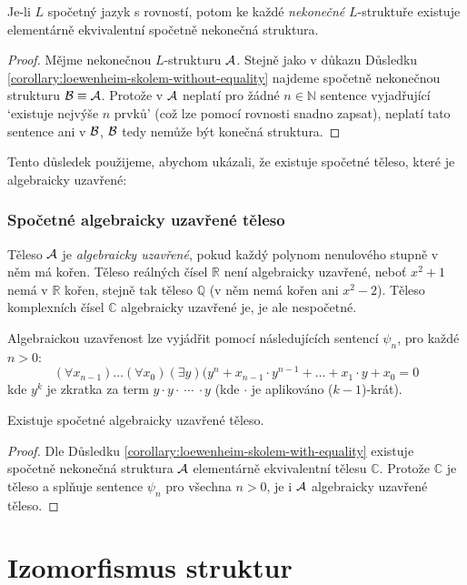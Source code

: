 \begin{corollary}\label{corollary:loewenheim-skolem-with-equality}
    Je-li $L$ spočetný jazyk s rovností, potom ke každé \emph{nekonečné} $L$-struktuře existuje elementárně ekvivalentní spočetně nekonečná struktura.
\end{corollary}
\begin{proof}
    Mějme nekonečnou $L$-strukturu $\mathcal{A}$. Stejně jako v důkazu Důsledku \ref{corollary:loewenheim-skolem-without-equality} najdeme spočetně nekonečnou strukturu $\mathcal{B}\equiv\mathcal{A}$. Protože v $\mathcal{A}$ neplatí pro žádné $n\in\mathbb N$ sentence vyjadřující `existuje nejvýše $n$ prvků' (což lze pomocí rovnosti snadno zapsat), neplatí tato sentence ani v $\mathcal{B}$, $\mathcal{B}$ tedy nemůže být konečná struktura.
\end{proof}

Tento důsledek použijeme, abychom ukázali, že existuje spočetné těleso, které je algebraicky uzavřené:  

\subsubsection*{Spočetné algebraicky uzavřené těleso}

Těleso $\mathcal{A}$ je \emph{algebraicky uzavřené}, pokud každý polynom nenulového stupně v něm má kořen. Těleso reálných čísel $\mathbb R$ není algebraicky uzavřené, neboť $x^2+1$ nemá v $\mathbb R$ kořen, stejně tak těleso $\mathbb Q$ (v něm nemá kořen ani $x^2-2$). Těleso komplexních čísel $\mathbb C$ algebraicky uzavřené je, je ale nespočetné.

Algebraickou uzavřenost lze vyjádřit pomocí následujících sentencí $\psi_n$, pro každé $n>0$:
$$
(\forall x_{n-1})\dots(\forall x_0)(\exists y)(y^n+x_{n-1}\cdot y^{n-1}+\dots+x_1\cdot y + x_0 = 0
$$
kde $y^k$ je zkratka za term $y\cdot y \cdot\ \cdots\ \cdot y$ (kde  $\cdot$ je aplikováno ($k-1$)-krát).

\begin{corollary}
    Existuje spočetné algebraicky uzavřené těleso.
\end{corollary}
\begin{proof}
    Dle Důsledku \ref{corollary:loewenheim-skolem-with-equality} existuje spočetně nekonečná struktura $\mathcal{A}$ elementárně ekvivalentní tělesu $\mathbb C$. Protože $\mathbb C$ je těleso a splňuje sentence $\psi_n$ pro všechna $n>0$, je i $\mathcal{A}$ algebraicky uzavřené těleso.
\end{proof}


\section{Izomorfismus struktur}\label{section:isomorphism-of-structures}


